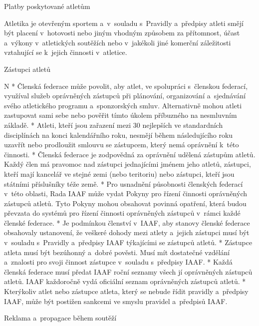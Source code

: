 \secc Platby poskytované atletům

Atletika je otevřeným sportem a~v~souladu s~Pravidly a~předpisy atleti smějí být placení v~hotovosti nebo jiným vhodným způsobem za přítomnost, účast a~výkony v~atletických soutěžích nebo v~jakékoli jiné komerční záležitosti vztahující se k~jejich činnosti v~atletice.

\secc Zástupci atletů

\begitems \style N
* Členská federace může povolit, aby atlet, ve spolupráci s~členskou federací, využíval služeb oprávněných zástupců při plánování, organizování a~sjednávání svého atletického programu a~sponzorských smluv. Alternativně mohou atleti zastupovat sami sebe nebo pověřit tímto úkolem příbuzného na nesmluvním základě.
* Atleti, kteří jsou zařazení mezi 30 nejlepších ve standardních disciplínách na konci kalendářního roku, nesmějí během následujícího roku uzavřít nebo prodloužit smlouvu se zástupcem, který nemá oprávnění k~této činnosti.
* Členská federace je zodpovědná za oprávnění udělená zástupům atletů. Každý člen má pravomoc nad zástupci jednajícími jménem jeho atletů, zástupci, kteří mají kancelář ve stejné zemi (nebo teritoriu) nebo zástupci, kteří jsou státními příslušníky téže země.
* Pro usnadnění působnosti členských federací v~této oblasti, Rada IAAF může vydat Pokyny pro řízení činnosti oprávněných zástupců atletů. Tyto Pokyny mohou obsahovat povinná opatření, která budou převzata do systémů pro řízení činnosti oprávněných zástupců v~rámci každé členské federace.
* Je podmínkou členství v~IAAF, aby stanovy členské federace obsahovaly ustanovení, že veškeré dohody mezi atlety a~jejich zástupci musí být v~souladu s~Pravidly a~předpisy IAAF týkajícími se zástupců atletů.
* Zástupce atleta musí být bezúhonný a~dobré pověsti. Musí mít dostatečné vzdělání a~znalosti pro svoji činnost zástupce v~souladu s~předpisy IAAF.
* Každá členská federace musí předat IAAF roční seznamy všech jí oprávněných zástupců atletů. IAAF každoročně vydá oficiální seznam oprávněných zástupců atletů.
* Kterýkoliv atlet nebo zástupce atleta, který se nebude řídit pravidly a~předpisy IAAF, může být postižen sankcemi ve smyslu pravidel a~předpisů IAAF.
\enditems

\secc Reklama a~propagace během soutěží


